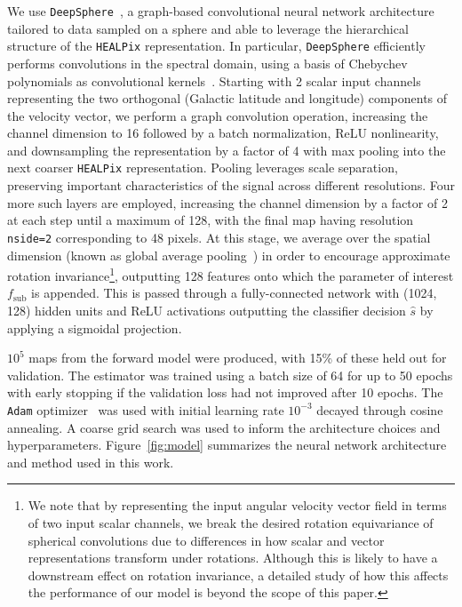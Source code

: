 \documentclass[preprint]{article}
\begin{document}
We use \texttt{DeepSphere}~\cite{defferrard2020deepsphere,Perraudin:2018rbt}, a graph-based convolutional neural network architecture tailored to data sampled on a sphere and able to leverage the hierarchical structure of the \texttt{HEALPix} representation. In particular, \texttt{DeepSphere} efficiently performs convolutions in the spectral domain, using a basis of Chebychev polynomials as convolutional kernels~\cite{defferrard2016convolutional}. Starting with 2 scalar input channels representing the two orthogonal (Galactic latitude and longitude) components of the velocity vector, we perform a graph convolution operation, increasing the channel dimension to 16 followed by a batch normalization, ReLU nonlinearity, and downsampling the representation by a factor of 4 with max pooling into the next coarser \texttt{HEALPix} representation. Pooling leverages scale separation, preserving important characteristics of the signal across different resolutions. 
Four more such layers are employed, increasing the channel dimension by a factor of 2 at each step until a maximum of 128, with the final map having resolution \texttt{nside=2} corresponding to 48 pixels. At this stage, we average over the spatial dimension (known as global average pooling~\cite{lin2014network}) in order to encourage approximate rotation invariance\footnote{We note that by representing the input angular velocity vector field in terms of two input scalar channels, we break the desired rotation equivariance of spherical convolutions due to differences in how scalar and vector representations transform under rotations. Although this is likely to have a downstream effect on rotation invariance, a detailed study of how this affects the performance of our model is beyond the scope of this paper.}, outputting 128 features onto which the parameter of interest $f_\mathrm{sub}$ is appended. This is passed through a fully-connected network with (1024, 128) hidden units and ReLU activations outputting the classifier decision $\hat s$ by applying a sigmoidal projection.

\bigskip

$10^5$ maps from the forward model were produced, with 15\% of these held out for validation. The estimator was trained using a batch size of 64 for up to 50 epochs with early stopping if the validation loss had not improved after 10 epochs. The \texttt{Adam} optimizer~\cite{kingma2017adam} was used with initial learning rate $10^{-3}$ decayed through cosine annealing. A coarse grid search was used to inform the architecture choices and hyperparameters. 
Figure~\ref{fig:model} summarizes the neural network architecture and method used in this work.
\end{document}
